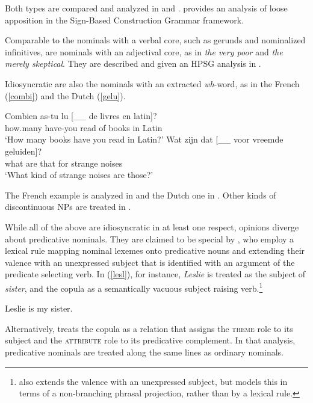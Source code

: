 \documentclass[output=paper
	        ,collection
	        ,collectionchapter
 	        ,biblatex
                ,babelshorthands
                ,newtxmath
                ,draftmode
                ,colorlinks, citecolor=brown
]{langscibook}
\begin{document}
\noindent
Both types are compared and analyzed in \citet{Kim12} and \citet{Kim14}. 
\citet{VanEyndeKim16} provides an analysis of loose apposition in the 
Sign-Based Construction Grammar framework. 

Comparable to the nominals with a verbal core, such as gerunds and nominalized 
infinitives, are nominals with an adjectival core, as in \emph{the very poor} and 
\emph{the merely skeptical}. They are described and given an HPSG analysis 
in \citet{ArnoldSpencer2015}.

Idiosyncratic are also the nominals with an extracted \emph{wh}-word, as in 
the French (\ref{combi}) and the Dutch (\ref{gelu}). 

\begin{exe} 
\ex\label{combi}  
\gll   Combien as-tu lu [\_\_ de livres en latin]?  \\
       how.many have-you read {} of books in Latin  \\ 
\trans `How many books have you read in Latin?' 
\ex\label{gelu}
\gll   Wat zijn dat [\_\_ voor vreemde geluiden]? \\
       what are that {} for strange noises        \\ 
\trans `What kind of strange noises are those?'  
\end{exe} 

\noindent
The French example is analyzed in \citet[20--21]{Abeilleetal04} and the Dutch one in 
\citet[47--50]{VanEynde04}. Other kinds of discontinuous NPs are treated in \citet{deKuthy2002a}. 

While all of the above are idiosyncratic in at least one respect, opinions diverge about 
predicative nominals. They are claimed to be special by \citet[409]{GS00}, who 
employ a lexical rule mapping nominal lexemes onto predicative nouns and 
extending their valence with an unexpressed subject that is identified with an argument of the 
predicate selecting verb. In (\ref{lesl}), for instance, \emph{Leslie} is treated as the subject 
of \emph{sister}, and the copula as a semantically vacuous subject raising 
verb.\footnote{\citet[225]{MuellerPredication} also extends the valence with an unexpressed subject, 
but models this in terms of a non-branching phrasal projection, rather than by a lexical rule.}   

\begin{exe} 
\ex\label{lesl}   Leslie is my sister. 
\end{exe} 
   
\noindent
Alternatively, \citet[158--163]{VanEynde15} treats the copula as a relation that assigns the \textsc{theme} 
role to its subject and the \textsc{attribute} role to its predicative complement. In that analysis, 
predicative nominals are treated along the same lines as ordinary nominals.  
  
\end{document}

